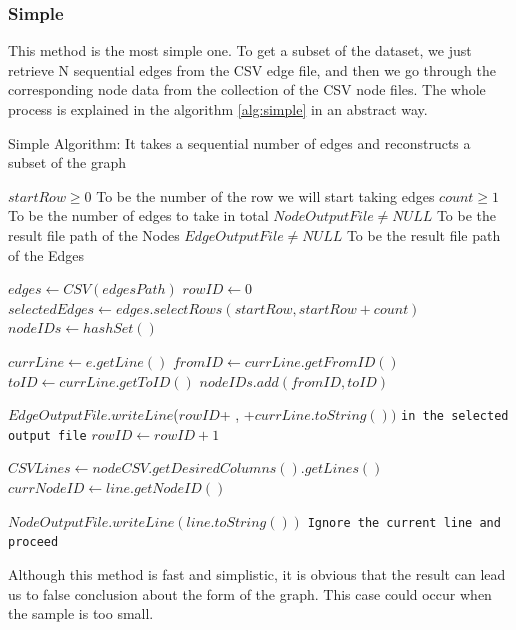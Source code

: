 \documentclass[sigconf, nonacm]{acmart}
\begin{document}
\subsubsection{Simple} 
This method is the most simple one. To get a subset of the dataset, we just retrieve N sequential edges from the CSV edge file, and then we go through the corresponding node data from the collection of the CSV node files. The whole process is explained in the algorithm \ref{alg:simple} in an abstract way.
\begin{algorithm}
\caption{Simple Algorithm: It takes a sequential number of edges and reconstructs a subset of the graph}\label{alg:simple}
\begin{algorithmic}

\Require $startRow \geq 0$ To be the number of the row we will start taking edges
\Require $count \geq 1$ To be the number of edges to take in total
\Require $NodeOutputFile \neq NULL$ To be the result file path of the Nodes
\Require $EdgeOutputFile \neq NULL$ To be the result file path of the Edges

\State
\State $edges \gets CSV(edgesPath)$
\State $rowID \gets 0$
\State $selectedEdges \gets edges.selectRows(startRow,startRow+count)$
\State $nodeIDs \gets hashSet()$

\State
{}
    \State $currLine \gets e.getLine()$
    \State $fromID \gets currLine.getFromID()$
    \State $toID \gets currLine.getToID()$
    \State$nodeIDs.add(fromID, toID)$
    
    \State $EdgeOutputFile.writeLine$($rowID$+ , +$currLine.toString())$ \texttt{in the selected output file}
    \State $rowID \gets rowID+1$
\EndFor

\State
{}

    \State $CSVLines \gets nodeCSV.getDesiredColumns().getLines()$
        \State $currNodeID \gets line.getNodeID()$
        
            \State $NodeOutputFile.writeLine(line.toString())$
        \Else
           \State \texttt{Ignore the current line and proceed}
        \EndIf
        
    \EndFor
\EndFor

\end{algorithmic}
\end{algorithm}
Although this method is fast and simplistic, it is obvious that the result can lead us to false conclusion about the form of the graph. This case could occur when the sample is too small.
\end{document}
